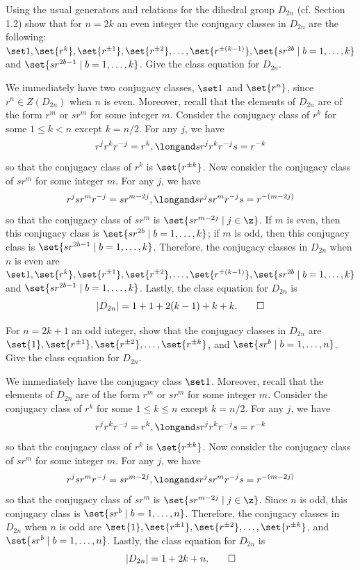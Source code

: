 \begin{exercise}
	Using the usual generators and relations for the dihedral group $D_{2n}$ (cf. Section 1.2) show that for $n = 2k$ an even integer the conjugacy classes in $D_{2n}$ are the following: $\set 1, \set{r^k}, \set{r^{\pm 1}}, \set{r^{\pm 2}}, \ldots, \set{r^{\pm(k - 1)}}, \set{sr^{2b} \mid b = 1, \ldots, k}$ and $\set{sr^{2b - 1} \mid b = 1, \ldots, k}$. Give the class equation for $D_{2n}$.
\end{exercise}

\begin{sol}
	We immediately have two conjugacy classes, $\set 1$ and $\set{r^n}$, since $r^n \in Z(D_{2n})$ when $n$ is even. Moreover, recall that the elements of $D_{2n}$ are of the form $r^m$ or $sr^m$ for some integer $m$. Consider the conjugacy class of $r^k$ for some $1 \leq k < n$ except $k = n/2$. For any $j$, we have
	\[r^jr^kr^{-j} = r^k, \longand sr^jr^kr^{-j}s = r^{-k}\]
	so that the conjugacy class of $r^k$ is $\set{r^{\pm k}}$. Now consider the conjugacy class of $sr^m$ for some integer $m$. For any $j$, we have
	\[r^jsr^mr^{-j} = sr^{m - 2j}, \longand sr^jsr^mr^{-j}s = r^{-(m - 2j)}\]
	so that the conjugacy class of $sr^m$ is $\set{sr^{m - 2j} \mid j \in \z}$. If $m$ is even, then this conjugacy class is $\set{sr^{2b} \mid b = 1, \ldots, k}$; if $m$ is odd, then this conjugacy class is $\set{sr^{2b - 1} \mid b = 1, \ldots, k}$. Therefore, the conjugacy classes in $D_{2n}$ when $n$ is even are $\set 1, \set{r^k}, \set{r^{\pm 1}}, \set{r^{\pm 2}}, \ldots, \set{r^{\pm(k - 1)}}, \set{sr^{2b} \mid b = 1, \ldots, k}$ and $\set{sr^{2b - 1} \mid b = 1, \ldots, k}$. Lastly, the class equation for $D_{2n}$ is
	\[|D_{2n}| = 1 + 1 + 2(k - 1) + k + k.\qedhere\]
\end{sol}

\begin{exercise}
	For $n = 2k + 1$ an odd integer, show that the conjugacy classes in $D_{2n}$ are $\set{1}, \set{r^{\pm 1}}, \set{r^{\pm 2}}, \ldots, \set{r^{\pm k}}$, and $\set{sr^b \mid b = 1, \ldots, n}$. Give the class equation for $D_{2n}$.
\end{exercise}

\begin{sol}
	We immediately have the conjugacy class $\set 1$. Moreover, recall that the elements of $D_{2n}$ are of the form $r^m$ or $sr^m$ for some integer $m$. Consider the conjugacy class of $r^k$ for some $1 \leq k \leq n$ except $k = n/2$. For any $j$, we have
	\[r^jr^kr^{-j} = r^k, \longand sr^jr^kr^{-j}s = r^{-k}\]
	so that the conjugacy class of $r^k$ is $\set{r^{\pm k}}$. Now consider the conjugacy class of $sr^m$ for some integer $m$. For any $j$, we have
	\[r^jsr^mr^{-j} = sr^{m - 2j}, \longand sr^jsr^mr^{-j}s = r^{-(m - 2j)}\]
	so that the conjugacy class of $sr^m$ is $\set{sr^{m - 2j} \mid j \in \z}$. Since $n$ is odd, this conjugacy class is $\set{sr^b \mid b = 1, \ldots, n}$. Therefore, the conjugacy classes in $D_{2n}$ when $n$ is odd are $\set{1}, \set{r^{\pm 1}}, \set{r^{\pm 2}}, \ldots, \set{r^{\pm k}}$, and $\set{sr^b \mid b = 1, \ldots, n}$. Lastly, the class equation for $D_{2n}$ is
	\[|D_{2n}| = 1 + 2k + n.\qedhere\]
\end{sol}

